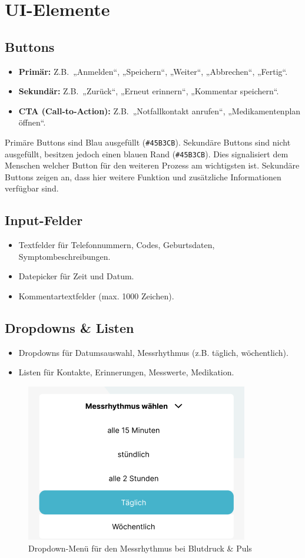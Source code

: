 \section{UI-Elemente}
\subsection{Buttons}
\begin{itemize}
	\item \textbf{Primär:} Z.B.\ „Anmelden“, „Speichern“, „Weiter“, „Abbrechen“, „Fertig“.
	\item \textbf{Sekundär:} Z.B.\ „Zurück“, „Erneut erinnern“, „Kommentar speichern“.
	\item \textbf{CTA (Call-to-Action):} Z.B.\ „Notfallkontakt anrufen“, „Medikamentenplan öffnen“.
\end{itemize}

Primäre Buttons sind Blau ausgefüllt (\texttt{\#45B3CB}). Sekundäre Buttons sind nicht ausgefüllt, besitzen jedoch einen blauen Rand (\texttt{\#45B3CB}). Dies signalisiert dem Menschen welcher Button für den weiteren Prozess am wichtigsten ist. Sekundäre Buttons zeigen an, dass hier weitere Funktion und zusätzliche Informationen verfügbar sind.

\subsection{Input-Felder}
\begin{itemize}
	\item Textfelder für Telefonnummern, Codes, Geburtsdaten, Symptombeschreibungen.
	\item Datepicker für Zeit und Datum.
	\item Kommentartextfelder (max. 1000 Zeichen).
\end{itemize}

\subsection{Dropdowns \& Listen}
\begin{itemize}
	\item Dropdowns für Datumsauswahl, Messrhythmus (z.B. täglich, wöchentlich).
	\item Listen für Kontakte, Erinnerungen, Messwerte, Medikation.
\end{itemize}

\begin{figure}[!h]
	\centering
	\includegraphics[width=0.45\linewidth]{images/Dropdown}
	\caption{Dropdown-Menü für den Messrhythmus bei Blutdruck \& Puls}
	\label{fig:dropdown}
\end{figure}

